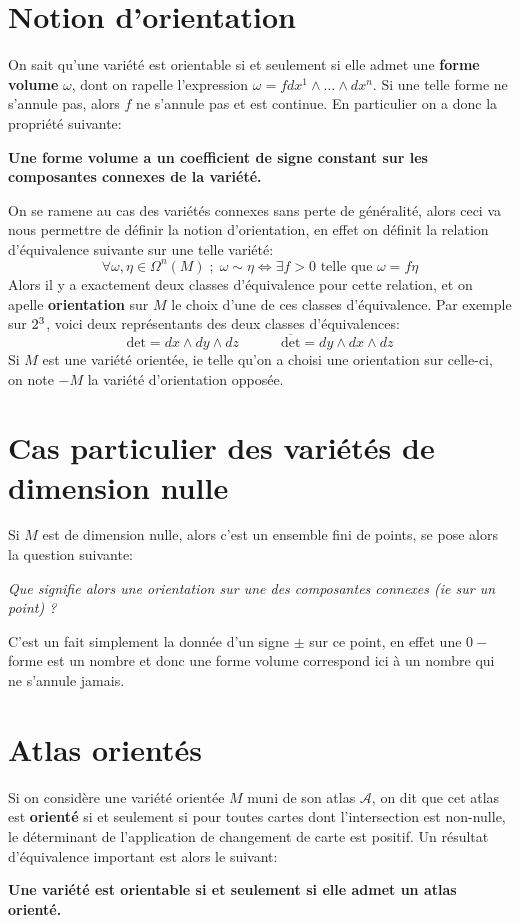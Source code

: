   \section{Notion d'orientation}
      On sait qu'une variété est orientable si et seulement si elle admet une \textbf{forme volume} \( \omega \), dont on rapelle l'expression \( \omega = fdx^1 \wedge \ldots \wedge dx^n \). Si une telle forme ne s'annule pas, alors \( f \) ne s'annule pas et est continue. En particulier on a donc la propriété suivante:
      \begin{center}
         \textbf{Une forme volume a un coefficient de signe constant sur les composantes connexes de la variété.}
      \end{center}
      On se ramene au cas des variétés connexes sans perte de généralité, alors ceci va nous permettre de définir la notion d'orientation, en effet on définit la relation d'équivalence suivante sur une telle variété:
      \[ 
          \forall \omega, \eta \in \Omega^n(M) \; ; \; \omega \sim \eta \iff \exists f > 0 \text{ telle que } \omega = f\eta 
      \]
      Alors il y a exactement deux classes d'équivalence pour cette relation, et on apelle \textbf{orientation} sur \( M \) le choix d'une de ces classes d'équivalence. Par exemple sur \( 2^3 \), voici deux représentants des deux classes d'équivalences:
      \[ 
         \text{det} = dx \wedge dy \wedge dz \quad\quad\quad \overline{\text{det}} = dy \wedge dx \wedge dz
      \]
      Si \( M \) est une variété orientée, ie telle qu'on a choisi une orientation sur celle-ci, on note \( -M \) la variété d'orientation opposée. 
   \section{Cas particulier des variétés de dimension nulle}
      Si \( M \) est de dimension nulle, alors c'est un ensemble fini de points, se pose alors la question suivante: 
      \begin{center}
         \textit{Que signifie alors une orientation sur une des composantes connexes (ie sur un point) ?}
      \end{center}
      C'est un fait simplement la donnée d'un signe \( \pm \) sur ce point, en effet une \( 0-\)forme est un nombre et donc une forme volume correspond ici à un nombre qui ne s'annule jamais.
   \section{Atlas orientés}
      Si on considère une variété orientée \( M \) muni de son atlas \( \mathcal{A} \), on dit que cet atlas est \textbf{orienté} si et seulement si pour toutes cartes dont l'intersection est non-nulle, le déterminant de l'application de changement de carte est positif. Un résultat d'équivalence important est alors le suivant:
      \begin{center}
         \textbf{Une variété est orientable si et seulement si elle admet un atlas orienté.}
      \end{center}
